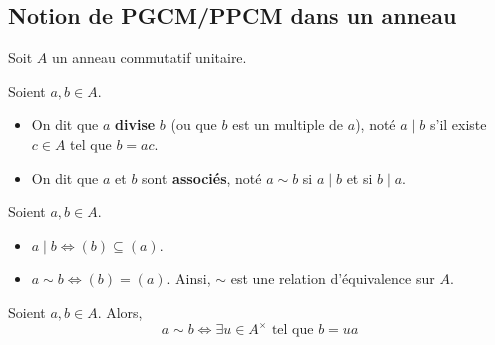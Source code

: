 




  \subsection{Notion de PGCM/PPCM dans un anneau}

  Soit $A$ un anneau commutatif unitaire.


  \begin{definition}
    Soient $a, b \in A$.
    \begin{itemize}
      \item On dit que $a$ \textbf{divise} $b$ (ou que $b$ est un multiple de $a$), noté $a \mid b$ s'il existe $c \in A$ tel que $b = ac$.
      \item On dit que $a$ et $b$ sont \textbf{associés}, noté $a \sim b$ si $a \mid b$ et si $b \mid a$.
    \end{itemize}
  \end{definition}

  \begin{remark}
    Soient $a, b \in A$.
    \begin{itemize}
      \item $a \mid b \iff (b) \subseteq (a)$.
      \item $a \sim b \iff (b) = (a)$. Ainsi, $\sim$ est une relation d'équivalence sur $A$.
    \end{itemize}
  \end{remark}

  \begin{proposition}
    Soient $a, b \in A$. Alors,
    \[ a \sim b \iff \exists u \in A^\times \text{ tel que } b = ua \]
  \end{proposition}

